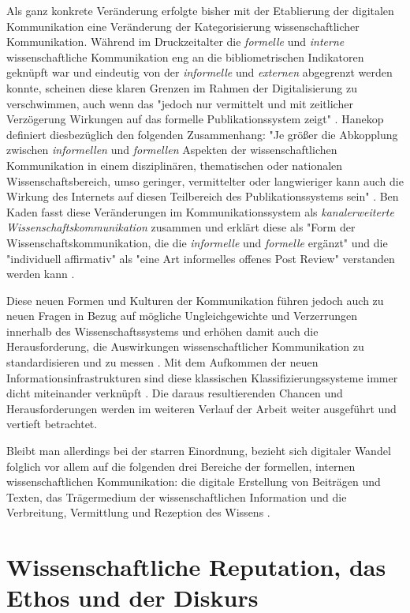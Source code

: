 Als ganz konkrete Veränderung erfolgte bisher mit der Etablierung der digitalen Kommunikation eine Veränderung der Kategorisierung wissenschaftlicher Kommunikation. Während im Druckzeitalter die \textit{formelle} und \textit{interne} wissenschaftliche Kommunikation eng an die bibliometrischen Indikatoren geknüpft war und eindeutig von der \textit{informelle} und \textit{externen} abgegrenzt werden konnte, scheinen diese klaren Grenzen im Rahmen der Digitalisierung zu verschwimmen, auch wenn das "jedoch nur vermittelt und mit zeitlicher Verzögerung Wirkungen auf das formelle Publikationssystem zeigt" \cite{Hanekop_2014}. Hanekop definiert diesbezüglich den folgenden Zusammenhang: "Je größer die Abkopplung zwischen \textit{informellen} und \textit{formellen} Aspekten der wissenschaftlichen Kommunikation in einem disziplinären, thematischen oder nationalen Wissenschaftsbereich, umso geringer, vermittelter oder langwieriger kann auch die Wirkung des Internets auf diesen Teilbereich des Publikationssystems sein" \cite{Hanekop_2014}. Ben Kaden fasst diese Veränderungen im Kommunikationssystem als \textit{kanalerweiterte Wissenschaftskommunikation} zusammen und erklärt diese als "Form der Wissenschaftskommunikation, die die \textit{informelle} und \textit{formelle} ergänzt" und die "individuell affirmativ" als "eine Art informelles offenes Post Review" verstanden werden kann \cite{kaden_2009_library}.

Diese neuen Formen und Kulturen der Kommunikation führen jedoch auch zu neuen Fragen in Bezug auf mögliche Ungleichgewichte und Verzerrungen innerhalb des Wissenschaftssystems und erhöhen damit auch die Herausforderung, die Auswirkungen wissenschaftlicher Kommunikation zu standardisieren und zu messen \cite{gerber_2014_science}. Mit dem Aufkommen der neuen Informationsinfrastrukturen sind diese klassischen Klassifizierungssysteme immer dicht miteinander verknüpft \cite[:326]{bowker_2000_sorting}. Die daraus resultierenden Chancen und Herausforderungen werden im weiteren Verlauf der Arbeit weiter ausgeführt und vertieft betrachtet.

Bleibt man allerdings bei der starren Einordnung, bezieht sich digitaler Wandel folglich vor allem auf die folgenden drei Bereiche der formellen, internen wissenschaftlichen Kommunikation: die digitale Erstellung von Beiträgen und Texten, das Trägermedium der wissenschaftlichen Information und die Verbreitung, Vermittlung und Rezeption des Wissens \cite{bbaw_publizieren_2015}.

\section{Wissenschaftliche Reputation, das Ethos und der Diskurs}

